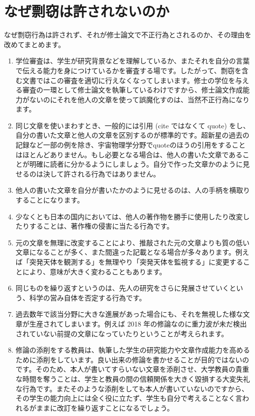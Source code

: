 \section{なぜ剽窃は許されないのか}

なぜ剽窃行為は許されず、それが修士論文で不正行為とされるのか、その理由を改めてまとめます。

\begin{enumerate}
\item 学位審査は、学生が研究背景などを理解しているか、またそれを自分の言葉で伝える能力を身につけているかを審査する場です。したがって、剽窃を含む文書ではこの審査を適切に行えなくなってしまいます。修士の学位を与える審査の一環として修士論文を執筆しているわけですから、修士論文作成能力がないのにそれを他人の文章を使って誤魔化すのは、当然不正行為になります。

\item 同じ文章を使いまわすとき、一般的には引用 (cite ではなくて quote) をし、自分の書いた文章と他人の文章を区別するのが標準的です。超新星の過去の記録など一部の例を除き、宇宙物理学分野でquoteのほうの引用をすることはほとんどありません。もし必要となる場合は、他人の書いた文章であることが明確に読者に分かるようにしましょう。自分で作った文章かのように見せるのは決して許される行為ではありません。

\item 他人の書いた文章を自分が書いたかのように見せるのは、人の手柄を横取りすることになります。

\item 少なくとも日本の国内においては、他人の著作物を勝手に使用したり改変したりすることは、著作権の侵害に当たる行為です。

\item 元の文章を無理に改変することにより、推敲された元の文章よりも質の低い文章になることが多く、また間違った記載となる場合が多々あります。例えば「突発天体を観測する」を無理やり「突発天体を監視する」に変更することにより、意味が大きく変わることもあります。

\item 同じものを繰り返すというのは、先人の研究をさらに発展させていくという、科学の営み自体を否定する行為です。

\item 過去数年で該当分野に大きな進展があった場合にも、それを無視した様な文章が生産されてしまいます。例えば 2018 年の修論なのに重力波が未だ検出されていない前提の文章になっていたりということが考えられます。

\item 修論の添削をする教員は、執筆した学生の研究能力や文章作成能力を高めるために添削をしています。良い出来の修論を書かせることが目的ではないのです。そのため、本人が書いてすらいない文章を添削させ、大学教員の貴重な時間を奪うことは、学生と教員の間の信頼関係を大きく毀損する大変失礼な行為です。またそのような添削をしても本人が書いていないのですから、その学生の能力向上には全く役に立たず、学生も自分で考えることなく言われるがままに改訂を繰り返すことになるでしょう。

\end{enumerate}

